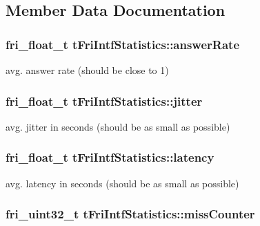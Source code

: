 \subsection{\-Member \-Data \-Documentation}
\hypertarget{structtFriIntfStatistics_aebfc203ffc0ecdeab0ea9980bf5ebff7}{
\subsubsection[{answer\-Rate}]{\setlength{\rightskip}{0pt plus 5cm}fri\-\_\-float\-\_\-t {\bf t\-Fri\-Intf\-Statistics\-::answer\-Rate}}}\label{structtFriIntfStatistics_aebfc203ffc0ecdeab0ea9980bf5ebff7}
avg. answer rate (should be close to 1) \hypertarget{structtFriIntfStatistics_abd760f07ee8a30dae44dac57c14a4099}{
\subsubsection[{jitter}]{\setlength{\rightskip}{0pt plus 5cm}fri\-\_\-float\-\_\-t {\bf t\-Fri\-Intf\-Statistics\-::jitter}}}\label{structtFriIntfStatistics_abd760f07ee8a30dae44dac57c14a4099}
avg. jitter in seconds (should be as small as possible) \hypertarget{structtFriIntfStatistics_a4d011bf7457df0c5af0a6babf7d575eb}{
\subsubsection[{latency}]{\setlength{\rightskip}{0pt plus 5cm}fri\-\_\-float\-\_\-t {\bf t\-Fri\-Intf\-Statistics\-::latency}}}\label{structtFriIntfStatistics_a4d011bf7457df0c5af0a6babf7d575eb}
avg. latency in seconds (should be as small as possible) \hypertarget{structtFriIntfStatistics_ad6806c15b51e4ba6ea8fb3d756833bb6}{
\subsubsection[{miss\-Counter}]{\setlength{\rightskip}{0pt plus 5cm}fri\-\_\-uint32\-\_\-t {\bf t\-Fri\-Intf\-Statistics\-::miss\-Counter}}}\label{structtFriIntfStatistics_ad6806c15b51e4ba6ea8fb3d756833bb6}
